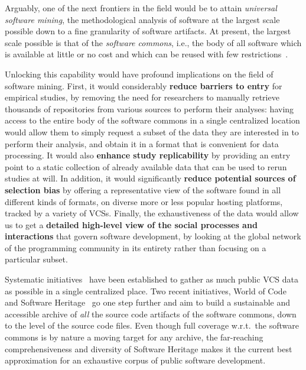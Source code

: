 Arguably, one of the next frontiers in the field would be to attain
\emph{universal software mining}, the methodological analysis of software at
the largest scale possible down to a fine granularity of software artifacts.
At present, the largest scale possible is that of the \emph{software commons},
i.e., the body of all software which is available at little or no cost and
which can be reused with few
restrictions~\cite{1999-beagle-in-commons,kranich2008information}.

Unlocking this capability would have profound implications on the field of
software mining. First, it would considerably \textbf{reduce barriers to entry}
for empirical studies, by removing the need for researchers to manually
retrieve thousands of repositories from various sources to perform their
analyses: having access to the entire body of the software commons in a single
centralized location would allow them to simply request a subset of the data
they are interested in to perform their analysis, and obtain it in a format
that is convenient for data processing. It would also \textbf{enhance study
replicability} by providing an entry point to a static collection of already
available data that can be used to rerun studies at will.
In addition, it would significantly \textbf{reduce potential sources of
selection bias} by offering a representative view of the software found in
all different kinds of formats, on diverse more or less popular hosting
platforms, tracked by a variety of \glspl{VCS}.  Finally, the exhaustiveness of
the data would allow us to get a \textbf{detailed high-level view of the social
processes and interactions} that govern software development, by looking at the
global network of the programming community in its entirety rather than
focusing on a particular subset.

Systematic initiatives~\cite{flossmole2006,gao2007archive,mockus2009}
have been established to gather as much public \gls{VCS} data as possible in a
single centralized place. Two recent initiatives, World of
Code~\cite{mockus2019woc} and Software Heritage~\cite{swhipres2017,
swhcacm2018} go one step further and aim to build a sustainable and accessible
archive of \emph{all} the source code artifacts of the software commons, down
to the level of the source code files. Even though full coverage w.r.t.\ the
software commons is by nature a moving target for any archive, the far-reaching
comprehensiveness and diversity of Software Heritage makes it the current best
approximation for an exhaustive corpus of public software development.

